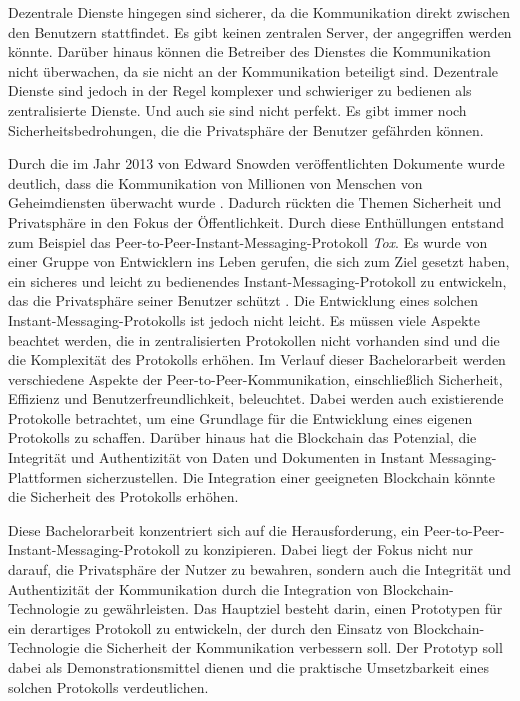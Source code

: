 Dezentrale Dienste hingegen sind sicherer, da die Kommunikation direkt zwischen den Benutzern stattfindet. Es gibt keinen zentralen Server, der angegriffen werden könnte. Darüber hinaus können die Betreiber des Dienstes die Kommunikation nicht überwachen, da sie nicht an der Kommunikation beteiligt sind. Dezentrale Dienste sind jedoch in der Regel komplexer und schwieriger zu bedienen als zentralisierte Dienste. Und auch sie sind nicht perfekt. Es gibt immer noch Sicherheitsbedrohungen, die die Privatsphäre der Benutzer gefährden können.


Durch die im Jahr 2013 von Edward Snowden veröffentlichten Dokumente wurde deutlich, dass die Kommunikation von Millionen von Menschen von Geheimdiensten überwacht wurde \parencite{greenwald_NSA}. Dadurch rückten die Themen Sicherheit und Privatsphäre in den Fokus der Öffentlichkeit. Durch diese Enthüllungen entstand zum Beispiel das Peer-to-Peer-Instant-Messaging-Protokoll \textit{Tox}. Es wurde von einer Gruppe von Entwicklern ins Leben gerufen, die sich zum Ziel gesetzt haben, ein sicheres und leicht zu bedienendes Instant-Messaging-Protokoll zu entwickeln, das die Privatsphäre seiner Benutzer schützt \parencite{tox_about}. Die Entwicklung eines solchen Instant-Messaging-Protokolls ist jedoch nicht leicht. Es müssen viele Aspekte beachtet werden, die in zentralisierten Protokollen nicht vorhanden sind und die die Komplexität des Protokolls erhöhen. Im Verlauf dieser Bachelorarbeit werden verschiedene Aspekte der Peer-to-Peer-Kommunikation, einschließlich Sicherheit, Effizienz und Benutzerfreundlichkeit, beleuchtet. Dabei werden auch existierende Protokolle betrachtet, um eine Grundlage für die Entwicklung eines eigenen Protokolls zu schaffen. Darüber hinaus hat die Blockchain das Potenzial, die Integrität und Authentizität von Daten und Dokumenten in Instant Messaging-Plattformen sicherzustellen. Die Integration einer geeigneten Blockchain könnte die Sicherheit des Protokolls erhöhen.

Diese Bachelorarbeit konzentriert sich auf die Herausforderung, ein Peer-to-Peer-Instant-Messaging-Protokoll zu konzipieren. Dabei liegt der Fokus nicht nur darauf, die Privatsphäre der Nutzer zu bewahren, sondern auch die Integrität und Authentizität der Kommunikation durch die Integration von Blockchain-Technologie zu gewährleisten. Das Hauptziel besteht darin, einen Prototypen für ein derartiges Protokoll zu entwickeln, der durch den Einsatz von Blockchain-Technologie die Sicherheit der Kommunikation verbessern soll. Der Prototyp soll dabei als Demonstrationsmittel dienen und die praktische Umsetzbarkeit eines solchen Protokolls verdeutlichen.

